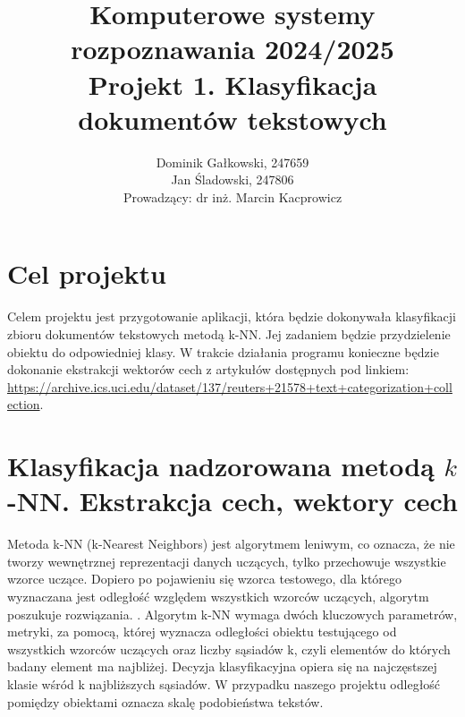\documentclass{article}
\author{
	{Dominik Gałkowski, 247659} \\
	{Jan Śladowski, 247806}\\ 
{Prowadzący: dr inż. Marcin Kacprowicz}
}
\title{Komputerowe systemy rozpoznawania 2024/2025\\Projekt 1. Klasyfikacja dokumentów tekstowych}
\begin{document}
\maketitle


\section{Cel projektu}
\indent Celem projektu jest przygotowanie aplikacji, która będzie dokonywała klasyfikacji zbioru dokumentów tekstowych metodą k-NN. Jej zadaniem będzie przydzielenie obiektu do odpowiedniej klasy. W trakcie działania programu konieczne będzie dokonanie ekstrakcji wektorów cech z artykułów dostępnych pod linkiem: 
\url{https://archive.ics.uci.edu/dataset/137/reuters+21578+text+categorization+collection}. \\

\section{Klasyfikacja nadzorowana metodą $k$-NN.  Ekstrakcja cech, wektory cech}
Metoda k-NN (k-Nearest Neighbors) jest algorytmem leniwym, co oznacza, że nie tworzy wewnętrznej reprezentacji danych uczących, tylko przechowuje wszystkie wzorce uczące. Dopiero po pojawieniu się wzorca testowego, dla którego wyznaczana jest odległość względem wszystkich wzorców uczących, algorytm poszukuje rozwiązania. \cite{knn}. Algorytm k-NN wymaga dwóch kluczowych parametrów, metryki, za pomocą, której wyznacza odległości obiektu testującego od wszystkich wzorców uczących oraz liczby sąsiadów k, czyli elementów do których badany element ma najbliżej. Decyzja klasyfikacyjna opiera się na najczęstszej klasie wśród k najbliższych sąsiadów. W przypadku naszego projektu odległość pomiędzy obiektami oznacza skalę podobieństwa tekstów.
\end{document}
